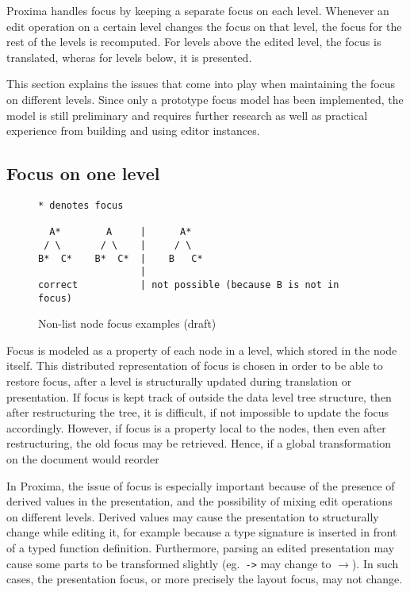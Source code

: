 Proxima handles focus by keeping a separate focus on each level. Whenever an edit operation on a certain level changes the focus on that level, the focus for the rest of the levels is recomputed. For levels above the edited level, the focus is translated, wheras for levels below, it is presented.

This section explains the issues that come into play when maintaining the focus on different levels. Since only a prototype focus model has been implemented, the model is still preliminary and requires further research as well as practical experience from building and using editor instances. 

 
%																
\subsection{Focus on one level}

\begin{figure}
\begin{small}
\begin{center}
\begin{verbatim}
* denotes focus

  A*        A     |      A*
 / \       / \    |     / \
B*  C*    B*  C*  |    B   C*
                  |
correct           | not possible (because B is not in focus)
\end{verbatim}
\caption{Non-list node focus examples (draft)}\label{correctIncorrect focus} 
\end{center}
\end{small}
\end{figure}

Focus is modeled as a property of each node in a level, which stored in the node itself. This distributed representation of focus is chosen in order to be able to restore focus, after a level is structurally updated during translation or presentation. If focus is kept track of outside the data level tree structure, then after restructuring the tree, it is difficult, if not impossible to update the focus accordingly. However, if focus is a property local to the nodes, then even after restructuring, the old focus may be retrieved. Hence, if a global transformation on the document would reorder 

In Proxima, the issue of focus is especially important because of the presence of derived values in the presentation, and the possibility of mixing edit operations on different levels. Derived values may cause the presentation to structurally change while editing it, for example because a type signature is inserted in front of a typed function definition. Furthermore, parsing an edited presentation may cause some parts to be transformed slightly (eg.\ \verb|->| may change to $\rightarrow$). In such cases, the presentation focus, or more precisely the layout focus, may not change.

